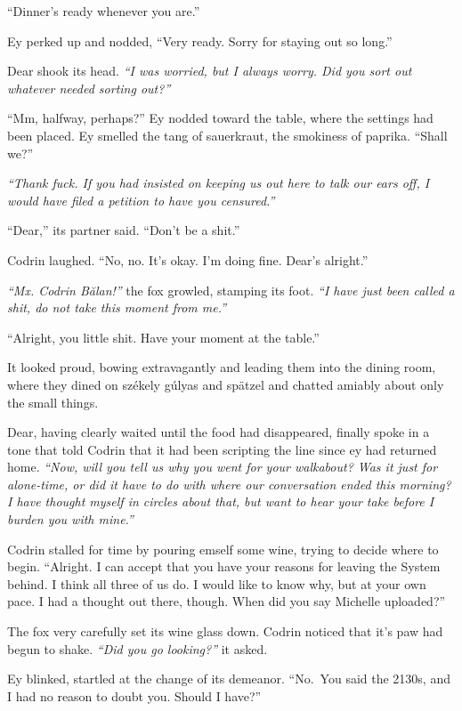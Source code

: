 ``Dinner's ready whenever you are.''

Ey perked up and nodded, ``Very ready. Sorry for staying out so long.''

Dear shook its head. \emph{``I was worried, but I always worry. Did you sort out whatever needed sorting out?''}

``Mm, halfway, perhaps?'' Ey nodded toward the table, where the settings had been placed. Ey smelled the tang of sauerkraut, the smokiness of paprika. ``Shall we?''

\emph{``Thank fuck. If you had insisted on keeping us out here to talk our ears off, I would have filed a petition to have you censured.''}

``Dear,'' its partner said. ``Don't be a shit.''

Codrin laughed. ``No, no. It's okay. I'm doing fine. Dear's alright.''

\emph{``Mx. Codrin Bălan!''} the fox growled, stamping its foot. \emph{``I have just been called a shit, do not take this moment from me.''}

``Alright, you little shit. Have your moment at the table.''

It looked proud, bowing extravagantly and leading them into the dining room, where they dined on székely gúlyas and spätzel and chatted amiably about only the small things.

Dear, having clearly waited until the food had disappeared, finally spoke in a tone that told Codrin that it had been scripting the line since ey had returned home. \emph{``Now, will you tell us why you went for your walkabout? Was it just for alone-time, or did it have to do with where our conversation ended this morning? I have thought myself in circles about that, but want to hear your take before I burden you with mine.''}

Codrin stalled for time by pouring emself some wine, trying to decide where to begin. ``Alright. I can accept that you have your reasons for leaving the System behind. I think all three of us do. I would like to know why, but at your own pace. I had a thought out there, though. When did you say Michelle uploaded?''

The fox very carefully set its wine glass down. Codrin noticed that it's paw had begun to shake. \emph{``Did you go looking?''} it asked.

Ey blinked, startled at the change of its demeanor. ``No.~You said the 2130s, and I had no reason to doubt you. Should I have?''


